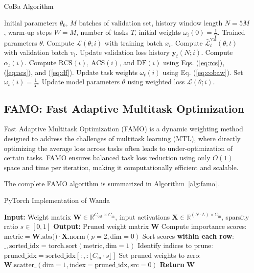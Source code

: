 \begin{algorithm}[t]
\caption{CoBa Algorithm}
\label{alg:coba}
\begin{algorithmic}[1]
\Require Initial parameters $\theta_0$, $M$ batches of validation set, history window length $N = 5M$, warm-up steps $W = M$, number of tasks $T$, initial weights $\omega_i(0) = \frac{1}{T}$.
\Ensure Trained parameters $\theta$.
    \State Compute $\mathcal{L}(\theta; i)$ with training batch $x_i$.
    \State Compute $\bar{\mathcal{L}}_t^{\text{val}}(\theta; t)$ with validation batch $v_i$.
    \State Update validation loss history $\mathbf{y}_t(N; i)$.
    \State Compute $\alpha_t(i)$.
        \State Compute $\text{RCS}(i)$, $\text{ACS}(i)$, and $\text{DF}(i)$ using Eqs. (\ref{eq:rcs}), (\ref{eq:acs}), and (\ref{eq:df}).
        \State Update task weights $\omega_t(i)$ using Eq. (\ref{eq:cobaw}).
    \Else
        \State Set $\omega_t(i) = \frac{1}{T}$.
    \EndIf
\State Update model parameters $\theta$ using weighted loss $\mathcal{L}(\theta; i)$.
\EndFor
\end{algorithmic}
\end{algorithm}

\subsection{FAMO: Fast Adaptive Multitask Optimization}

Fast Adaptive Multitask Optimization (FAMO) is a dynamic weighting method designed to address the challenges of multitask learning (MTL), where directly optimizing the average loss across tasks often leads to under-optimization of certain tasks. FAMO ensures balanced task loss reduction using only $O(1)$ space and time per iteration, making it computationally efficient and scalable.

The complete FAMO algorithm is summarized in Algorithm~\ref{alg:famo}.

\begin{algorithm}[t]
\caption{PyTorch Implementation of Wanda}
\label{alg:wanda}
\begin{algorithmic}
\State \textbf{Input:} Weight matrix $\mathbf{W} \in \mathbb{R}^{C_{\text{out}} \times C_{\text{in}}}$, input activations $\mathbf{X} \in \mathbb{R}^{(N \cdot L) \times C_{\text{in}}}$, sparsity ratio $s \in [0, 1]$
\State \textbf{Output:} Pruned weight matrix $\mathbf{W}$
\State Compute importance scores: $\text{metric} = \mathbf{W}.\text{abs()} \cdot \mathbf{X}.\text{norm}(p=2, \text{dim}=0)$
\State Sort scores \textbf{within each row}: $\_, \text{sorted\_idx} = \text{torch.sort}(\text{metric}, \text{dim}=1)$
\State Identify indices to prune: $\text{pruned\_idx} = \text{sorted\_idx}[:, :\lfloor C_{\text{in}} \cdot s \rfloor]$
\State Set pruned weights to zero: $\mathbf{W}.\text{scatter\_}(\text{dim}=1, \text{index}=\text{pruned\_idx}, \text{src}=0)$
\State \textbf{Return} $\mathbf{W}$
\end{algorithmic}
\end{algorithm}


